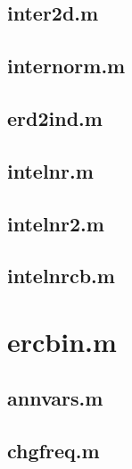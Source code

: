 \subsection{inter2d.m}
\label{sec:app18}



\subsection{internorm.m}
\label{sec:app19}


\subsection{erd2ind.m}
\label{sec:app20}



\subsection{intelnr.m}
\label{sec:app21}


\subsection{intelnr2.m}
\label{sec:app22}


\subsection{intelnrcb.m}
\label{sec:app23}


\section{ercbin.m}
\label{sec:app24}


\subsection{annvars.m}
\label{sec:app25}


\subsection{chgfreq.m}
\label{sec:app26}


